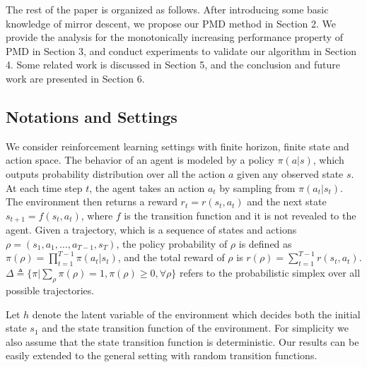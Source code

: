 \documentclass{article}
\begin{document}
The rest of the paper is organized as follows. After introducing some basic knowledge of mirror descent, we propose our PMD method in Section 2. We provide the analysis for the monotonically increasing performance property of PMD in Section 3, and conduct experiments to validate our algorithm in Section 4. Some related work is discussed in Section 5, and the conclusion and future work are presented in Section 6.

\subsection{Notations and Settings}

We consider reinforcement learning settings with finite horizon, finite state and action space. The behavior of an agent is modeled by a policy $\pi(a|s)$, which outputs probability distribution over all the action $a$ given any observed state $s$. At each time step $t$, the agent takes an action $a_t$ by sampling from $\pi(a_t | s_t)$. The environment then returns a reward $r_t = r(s_t, a_t)$ and the next state $s_{t+1} = f(s_t, a_t)$, where $f$ is the transition function and it is not revealed to the agent. Given a trajectory, which is a sequence of states and actions $\rho=(s_1, a_1, \dots, a_{T-1}, s_T)$, the policy probability of $\rho$ is defined as $\pi(\rho) = \prod_{t=1}^{T-1} \pi(a_t| s_t)$, and the total reward of $\rho$ is $r(\rho) = \sum_{t=1}^{T-1} r(s_t, a_t)$. $\Delta \triangleq \{ \pi | \sum_{\rho}{\pi(\rho)} = 1, \pi(\rho) \ge 0, \forall \rho \}$ refers to the probabilistic simplex over all possible trajectories. 

Let $h$ denote the latent variable of the environment which decides both the initial state $s_1$ and the state transition function of the environment. 
For simplicity we also assume that the state transition function is deterministic. 
Our results can be easily extended to the general setting with random transition functions.
\end{document}
